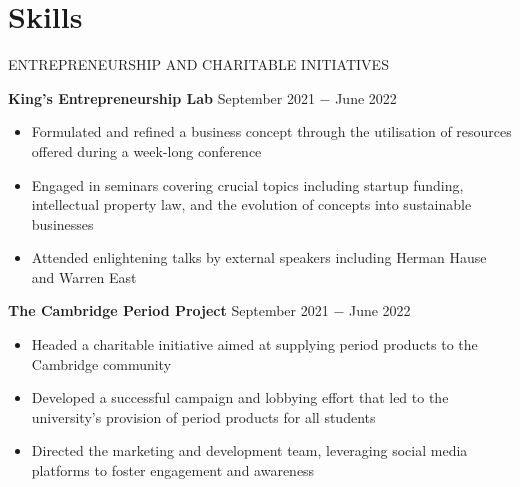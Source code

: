 \documentclass{article}
\begin{document}


\vspace{-0.75\baselineskip}
\hrulefill
\vspace{-0.75\baselineskip}

\clearpage
\section*{Skills}

\uppercase{Entrepreneurship and Charitable Initiatives}

\textbf{King's Entrepreneurship Lab} \hfill September 2021 $-$ June 2022
\begin{itemize}
    \item Formulated and refined a business concept through the utilisation of resources offered during a week-long conference
    \item Engaged in seminars covering crucial topics including startup funding, intellectual property law, and the evolution of concepts into sustainable businesses
    \item Attended enlightening talks by external speakers including Herman Hause and Warren East
\end{itemize} \medskip

\textbf{The Cambridge Period Project} \hfill September 2021 $-$ June 2022
\begin{itemize}
    \item Headed a charitable initiative aimed at supplying period products to the Cambridge community
    \item Developed a successful campaign and lobbying effort that led to the university's provision of period products for all students
    \item Directed the marketing and development team, leveraging social media platforms to foster engagement and awareness
\end{itemize}\medskip
\end{document}
